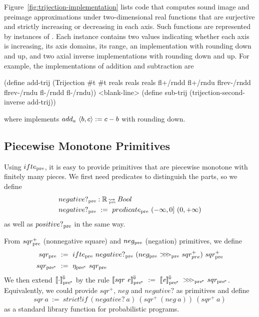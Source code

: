 Figure~\ref{fig:trijection-implementation} lists code that computes sound image and preimage approximations under two-dimensional real functions that are surjective and strictly increasing or decreasing in each axis.
Such functions are represented by instances of .
Each instance contains two  values indicating whether each axis is increasing, its axis domains, its range, an implementation with rounding down and up, and two axial inverse implementations with rounding down and up.
For example, the implementations of addition and subtraction are
\begin{center}\singlespacing
\begin{schemedisplay}
(define add-trij
  (Trijection #t #t reals reals reals
              fl+/rndd fl+/rndu
              flrev-/rndd flrev-/rndu
              fl-/rndd fl-/rndu))
<blank-line>
(define sub-trij
  (trijection-second-inverse add-trij))
\end{schemedisplay}
\end{center}
where  implements $add_a~\langle{b,c}\rangle := c - b$ with rounding down.

\subsection{Piecewise Monotone Primitives}
\label{sec:piecewise-monotone-primitives}

Using $ifte_\mathrm{pre}$, it is easy to provide primitives that are piecewise monotone with finitely many pieces.
We first need predicates to distinguish the parts, so we define
\begin{equation}
\begin{aligned}
	&negative?_\mathrm{pre} : \mathbb{R} \operatorname{\rightsquigarrow_{\mspace{-20mu}_\mathrm{pre}}} Bool \\
	&negative?_\mathrm{pre}\ :=\ predicate_\mathrm{pre}~(-\infty,0]~(0,+\infty)
\end{aligned}
\label{eqn:negative-pre}
\end{equation}
as well as $positive?_\mathrm{pre}$ in the same way.

From $sqr^+_\mathrm{pre}$ (nonnegative square) and $neg_\mathrm{pre}$ (negation) primitives, we define
\begin{equation}
\begin{aligned}
	sqr\pre&\ :=\ \ifpre~negative?\pre~(neg\pre~\comppre~sqr^+_{pre})~sqr^+\pre
\\
	sqr\ppre&\ :=\ \eta\ppre~sqr\pre
\end{aligned}
\end{equation}
We then extend $\left\llbracket{\cdot}\right\rrbracket^{\mspace{-2mu}\Downarrow\mspace{-2mu}}_\mathrm{pre^{\mspace{-2mu}*}}$ by the rule $\meaningofconv{sqr~\mathit{e}}\ppre\ :=\ \meaningofconv{\mathit{e}}\ppre~\compppre~sqr\ppre$.
Equivalently, we could provide $sqr^+$, $neg$ and $negative?$ as primitives and define
\begin{equation}
	sqr~a\ :=\ strict!if~(negative?~a)~(sqr^+~(neg~a))~(sqr^+~a)
\end{equation}
as a standard library function for probabilistic programs.

